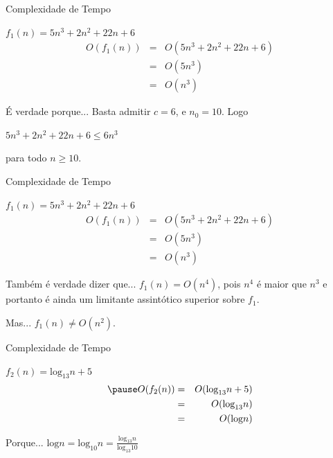 \documentclass[xcolor=dvipsnames,table]{beamer}
\begin{document}
	\begin{frame}{Complexidade de Tempo}
		\begin{block}{$f_1 (n) = 5n^3 + 2n^2 + 22n + 6$}
			\begin{eqnarray}
			O(f_1(n)) & = & O(5n^3 + 2n^2 + 22n + 6)\\
			& = & O(5n^3)\\
			& = & O(n^3)
			\end{eqnarray}
		\end{block} \pause
		\begin{exampleblock}{É verdade porque...}
			Basta admitir $c = 6$, e $n_0 = 10$. Logo
			\begin{center}
				$5n^3 + 2n^2 + 22n + 6 \leq 6n^3$
			\end{center}
			para todo $n \geq 10$.
		\end{exampleblock}
	\end{frame}
	
	\begin{frame}{Complexidade de Tempo}
		\begin{block}{$f_1 (n) = 5n^3 + 2n^2 + 22n + 6$}
			\begin{eqnarray}
			O(f_1(n)) & = & O(5n^3 + 2n^2 + 22n + 6)\\
			& = & O(5n^3)\\
			& = & O(n^3)
			\end{eqnarray}
		\end{block} \pause
		\begin{exampleblock}{Também é verdade dizer que...}
			$f_1(n) = O(n^4)$, pois $n^4$ é maior que $n^3$ e portanto é ainda um limitante assintótico superior sobre $f_1$.
		\end{exampleblock} \pause
		\begin{alertblock}{Mas...}
			$f_1(n) \not= O(n^2)$.
		\end{alertblock}
	\end{frame}
	
	\begin{frame}{Complexidade de Tempo}
		\begin{block}{$f_2 (n) = \mbox{log}_{13} n + 5$}
			\begin{eqnarray} \pause
			O(f_2(n)) & = & O(\mbox{log}_{13} n + 5)\\
			& = & O(\mbox{log}_{13} n)\\
			& = & O(\mbox{log} n)
			\end{eqnarray}
		\end{block} \pause
		\begin{exampleblock}{Porque...}
			$\mbox{log} n = \mbox{log}_{10} n  = \frac{\mbox{log}_{13} n}{\mbox{log}_{13} 10}$
		\end{exampleblock}
	\end{frame}
	
\end{document}
